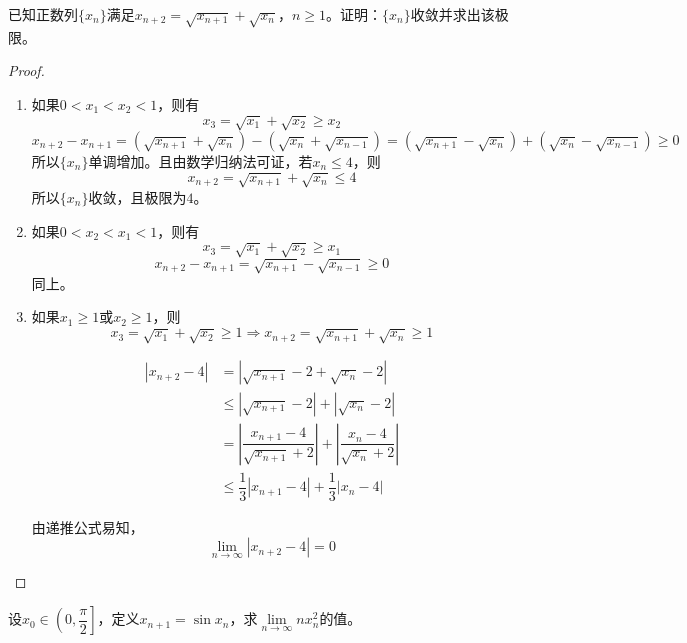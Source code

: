 \begin{proposition}
    
    已知正数列$\{x_n\}$满足$x_{n + 2} = \sqrt{x_{n + 1}} + \sqrt{x_{n}}$，$n \geq 1$。证明：$\{x_n\}$收敛并求出该极限。

\end{proposition}

\begin{proof}

    \begin{enumerate}

        \item 如果$0 < x_1 < x_2 < 1$，则有
            $$x_3 = \sqrt{x_1} + \sqrt{x_2} \geq x_2$$
            $$x_{n + 2} - x_{n + 1} = (\sqrt{x_{n + 1}} + \sqrt{x_{n}}) - (\sqrt{x_{n}} + \sqrt{x_{n - 1}}) = (\sqrt{x_{n + 1}} - \sqrt{x_{n}}) + (\sqrt{x_{n}} - \sqrt{x_{n - 1}}) \geq 0$$
            所以$\{x_n\}$单调增加。且由数学归纳法可证，若$x_n \leq 4$，则
            $$x_{n + 2} = \sqrt{x_{n + 1}} + \sqrt{x_{n}} \leq 4$$
            所以$\{x_n\}$收敛，且极限为$4$。
        \item 如果$0 < x_2 < x_1 < 1$，则有
            $$x_3 = \sqrt{x_1} + \sqrt{x_2} \geq x_1$$
            $$x_{n + 2} - x_{n + 1} = \sqrt{x_{n + 1}} - \sqrt{x_{n - 1}} \geq 0$$
            同上。
        \item 如果$x_1 \geq 1$或$x_2 \geq 1$，则
            $$x_3 = \sqrt{x_1} + \sqrt{x_2} \geq 1 \Longrightarrow x_{n + 2} = \sqrt{x_{n + 1}} + \sqrt{x_{n}} \geq 1$$
            
            \begin{align*}
                |x_{n + 2} - 4| & = |\sqrt{x_{n + 1}} - 2 + \sqrt{x_{n}} - 2| \\
                & \leq |\sqrt{x_{n + 1}} - 2| + |\sqrt{x_{n}} - 2| \\
                & = \left|\dfrac{x_{n + 1} - 4}{\sqrt{x_{n + 1}} + 2}\right| + \left|\dfrac{x_{n} - 4}{\sqrt{x_{n}} + 2}\right| \\
                & \leq \dfrac{1}{3} |x_{n + 1} - 4| + \dfrac{1}{3}|x_n - 4| 
            \end{align*}

            由递推公式易知，
            $$\lim\limits_{n \to \infty}{|x_{n + 2} - 4|} = 0$$

    \end{enumerate}

\end{proof}

\begin{proposition}

    设$x_0 \in \left(0, \dfrac{\pi}{2}\right]$，定义$x_{n + 1} = \sin x_n$，求$\lim\limits_{n \to\infty}{nx_n^2}$的值。

\end{proposition}

